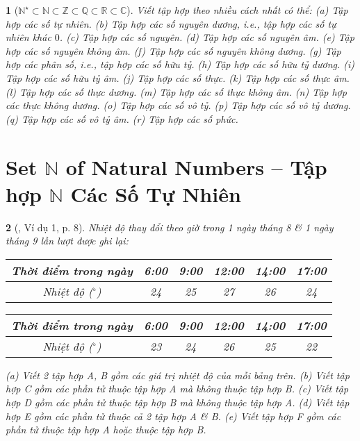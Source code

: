 \documentclass{article}
\newtheorem{baitoan}{}
\begin{document}
\begin{baitoan}[$\mathbb{N}^\star\subset\mathbb{N}\subset\mathbb{Z}\subset\mathbb{Q}\subset\mathbb{R}\subset\mathbb{C}$]
	Viết tập hợp theo nhiều cách nhất có thể: (a) Tập hợp các số tự nhiên. (b) Tập hợp các số nguyên dương, i.e., tập hợp các số tự nhiên khác $0$. (c) Tập hợp các số nguyên. (d) Tập hợp các số nguyên âm. (e) Tập hợp các số nguyên không âm. (f) Tập hợp các số nguyên không dương. (g) Tập hợp các phân số, i.e., tập hợp các số hữu tỷ. (h) Tập hợp các số hữu tỷ dương. (i) Tập hợp các số hữu tỷ âm. (j) Tập hợp các số thực. (k) Tập hợp các số thực âm. (l) Tập hợp các số thực dương. (m) Tập hợp các số thực không âm. (n) Tập hợp các thực không dương. (o) Tập hợp các số vô tỷ. (p) Tập hợp các số vô tỷ dương. (q) Tập hợp các số vô tỷ âm. (r) Tập hợp các số phức.
\end{baitoan}


\section{Set $\mathbb{N}$ of Natural Numbers -- Tập hợp $\mathbb{N}$ Các Số Tự Nhiên}

\begin{baitoan}[\cite{Binh_boi_duong_Toan_6_tap_1}, Ví dụ 1, p. 8]
	Nhiệt độ thay đổi theo giờ trong 1 ngày tháng 8 \& 1 ngày tháng 9 lần lượt được ghi lại:
	\begin{table}[H]
		\centering
		\begin{tabular}{|c|c|c|c|c|c|}
			\hline
			Thời điểm trong ngày & 6:00 & 9:00 & 12:00 & 14:00 & 17:00 \\
			\hline
			Nhiệt độ (${}^\circ$) & 24 & 25 & 27 & 26 & 24 \\
			\hline
		\end{tabular}
	\end{table}
	\begin{table}[H]
		\centering
		\begin{tabular}{|c|c|c|c|c|c|}
			\hline
			Thời điểm trong ngày & 6:00 & 9:00 & 12:00 & 14:00 & 17:00 \\
			\hline
			Nhiệt độ (${}^\circ$) & 23 & 24 & 26 & 25 & 22 \\
			\hline
		\end{tabular}
	\end{table}
	\noindent(a) Viết 2 tập hợp A, B gồm các giá trị nhiệt độ của mỗi bảng trên. (b) Viết tập hợp C gồm các phần tử thuộc tập hợp A mà không thuộc tập hợp B. (c) Viết tập hợp D gồm các phần tử thuộc tập hợp B mà không thuộc tập hợp A. (d) Viết tập hợp E gồm các phần tử thuộc cả 2 tập hợp A \& B. (e) Viết tập hợp F gồm các phần tử thuộc tập hợp A hoặc thuộc tập hợp B.
\end{baitoan}
\end{document}
